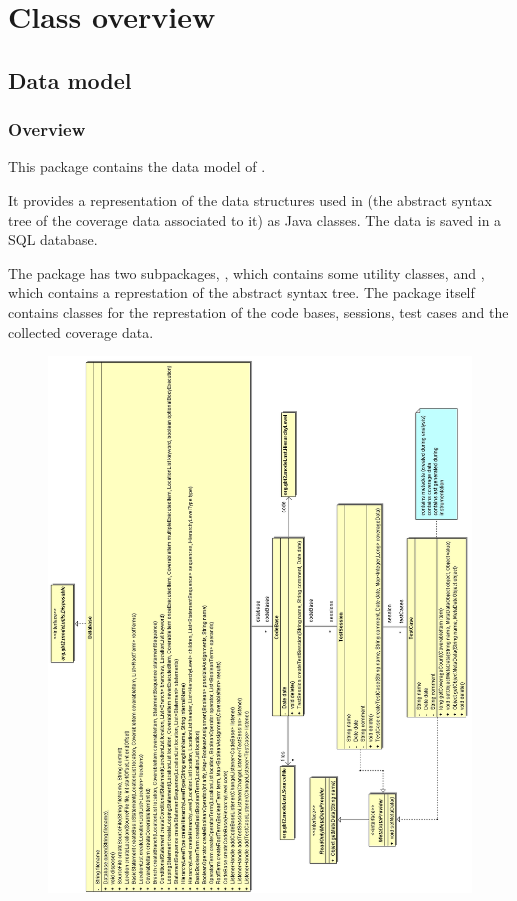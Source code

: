 \section{Class overview} \label{Classes}

\subsection{Data model}


\subsubsection{Overview}

This package contains the data model of \gbt{}.

It provides a representation of the data structures used in \gbt{} (the
abstract syntax tree of the coverage data associated to it) as Java classes.
The data is saved in a SQL database.

The package has two subpackages, , which contains some
utility classes, and , which contains a represtation
of the abstract syntax tree. The package  itself contains
classes for the represtation of the code bases, sessions, test cases and the
collected coverage data.

\begin{figure}[hbtp]
 \centering
 \includegraphics[width=1.0\textwidth]{images/Model/model_land.png}
 \caption{}
 \label{figure:Classes:Model}
\end{figure}

